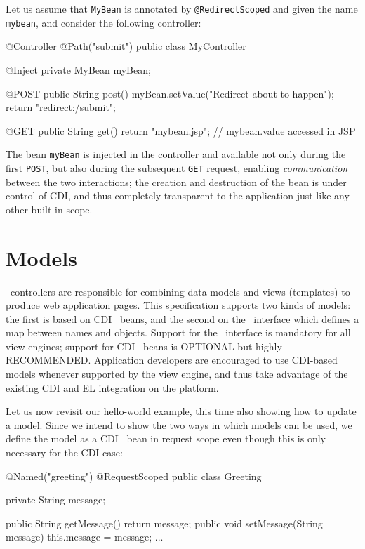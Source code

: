 Let us assume that {\tt MyBean} is annotated by {\tt @RedirectScoped} and given
the name {\tt mybean}, and consider the following controller:

\begin{listing}{1}
@Controller
@Path("submit")
public class MyController {

    @Inject
    private MyBean myBean;
    
    @POST
    public String post() {
        myBean.setValue("Redirect about to happen");
        return "redirect:/submit";
    }

    @GET
    public String get() {
        return "mybean.jsp";    // mybean.value accessed in JSP
    }
}
\end{listing}

The bean {\tt myBean} is injected in the controller and available not only during
the first {\tt POST}, but also during the subsequent {\tt GET} request, enabling
{\em communication} between the two interactions; the creation and destruction
of the bean is under control of CDI, and thus completely transparent to the application
 just like any other built-in scope.

\section{Models}
\label{models}

\mvc\ controllers are responsible for combining data models and views (templates) to 
produce web application pages. This specification supports two kinds of models: the
first is based on CDI \Named\ beans, and the second on the \Models\ interface
which defines a map between names and objects. Support for the \Models\ 
interface is mandatory for all view engines; support for CDI \Named\ beans is
OPTIONAL but highly RECOMMENDED. Application developers are encouraged to use CDI-based
models whenever supported by the view engine, and thus take advantage of the existing
CDI and EL integration on the platform.

Let us now revisit our hello-world example, this time also showing how to update
a model. Since we intend to show the two ways in which models can be used, we define the
model as a CDI \Named\ bean in request scope even though this is only necessary
for the CDI case:

\begin{listing}{1}
@Named("greeting")
@RequestScoped
public class Greeting {

	private String message;
	
	public String getMessage() { return message; }
	public void setMessage(String message) { this.message = message; }
	...
}
\end{listing}

